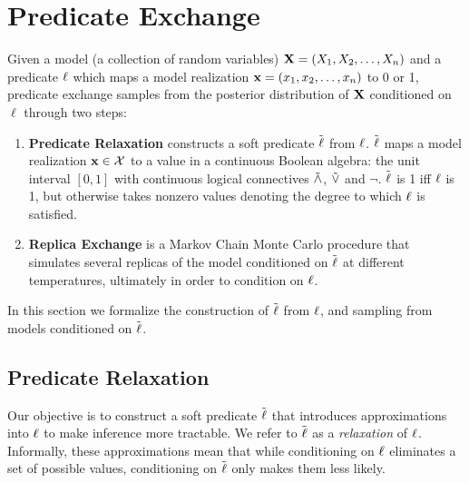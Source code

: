 \section{Predicate Exchange}

Given a model (a collection of random variables)  $\mathbf{X} = (X_1, X_2, \dots, X_n)$ and a predicate $\operatorname{\ell}$ which maps a model realization  $\mathbf{x} = (x_1, x_2, \dots, x_n)$ to 0 or 1, predicate exchange samples from the posterior distribution of $\mathbf{X}$ conditioned on $\ell$ through two steps:
\begin{enumerate}
\item \textbf{Predicate Relaxation} constructs a soft predicate $\mathrel{\tilde{\operatorname{\ell}}}$ from $\operatorname{\ell}$. $\mathrel{\tilde{\operatorname{\ell}}}$ maps a model realization $\mathbf{x} \in {\mathcal{X}}$ to a value in a continuous Boolean algebra: the unit interval $[0, 1]$ with continuous logical connectives $\mathrel{\tilde{\land}}$, $\mathrel{\tilde{\lor}}$ and $\neg$.
$\mathrel{\tilde{\operatorname{\ell}}}$ is 1 iff $\operatorname{\ell}$ is 1, but otherwise takes nonzero values denoting the degree to which $\operatorname{\ell}$ is satisfied.
\item  \textbf{Replica Exchange} is a Markov Chain Monte Carlo procedure that simulates several replicas  of the model conditioned on $\mathrel{\tilde{\operatorname{\ell}}}$ at different temperatures, ultimately in order to condition on $\operatorname{\ell}$. 
\end{enumerate}

In this section we formalize the construction of $\mathrel{\tilde{\operatorname{\ell}}}$ from $\operatorname{\ell}$, and sampling from models conditioned on $\mathrel{\tilde{\operatorname{\ell}}}$.

\subsection{Predicate Relaxation}\label{predexchange}

Our objective is to construct a soft predicate $\mathrel{\tilde{\operatorname{\ell}}}$ that introduces approximations into $\operatorname{\ell}$ to make inference more tractable.
We refer to $\mathrel{\tilde{\operatorname{\ell}}}$ as a \emph{relaxation} of $\operatorname{\ell}$.
Informally, these approximations mean that while conditioning on $\operatorname{\ell}$ eliminates a set of possible values, conditioning on $\mathrel{\tilde{\operatorname{\ell}}}$ only makes them less likely.

